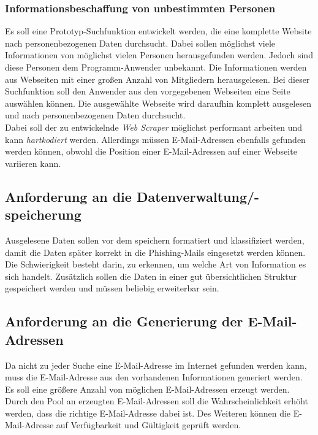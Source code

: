 		\subsubsection{Informationsbeschaffung von unbestimmten Personen}
		Es soll eine Prototyp-Suchfunktion entwickelt werden, die eine komplette Website nach personenbezogenen Daten durchsucht. Dabei sollen möglichst viele Informationen von möglichst vielen Personen herausgefunden werden. Jedoch sind diese Personen dem Programm-Anwender unbekannt. Die Informationen werden aus Webseiten mit einer großen Anzahl von Mitgliedern herausgelesen. Bei dieser Suchfunktion soll den Anwender aus den vorgegebenen Webseiten eine Seite auswählen können. Die ausgewählte Webseite wird daraufhin komplett ausgelesen und nach personenbezogenen Daten durchsucht.\\
		Dabei soll der zu entwickelnde \textit{Web Scraper} möglichst performant arbeiten und kann \textit{hartkodiert} werden. Allerdings müssen E-Mail-Adressen ebenfalls gefunden werden können, obwohl die Position einer E-Mail-Adressen auf einer Webseite variieren kann.
		
	\subsection{Anforderung an die Datenverwaltung/-speicherung}
	Ausgelesene Daten sollen vor dem speichern formatiert und klassifiziert werden, damit die Daten später korrekt in die Phishing-Mails eingesetzt werden können. Die Schwierigkeit besteht darin, zu erkennen, um welche Art von Information es sich handelt. Zusätzlich sollen die Daten in einer gut übersichtlichen Struktur gespeichert werden und müssen beliebig erweiterbar sein.
	
	\subsection{Anforderung an die Generierung der E-Mail-Adressen}
	Da nicht zu jeder Suche eine E-Mail-Adresse im Internet gefunden werden kann, muss die E-Mail-Adresse aus den vorhandenen Informationen generiert werden. Es soll eine größere Anzahl von möglichen E-Mail-Adressen erzeugt werden. Durch den Pool an erzeugten E-Mail-Adressen soll die Wahrscheinlichkeit erhöht werden, dass die richtige E-Mail-Adresse dabei ist. Des Weiteren können die E-Mail-Adresse auf Verfügbarkeit und Gültigkeit geprüft werden.
	
